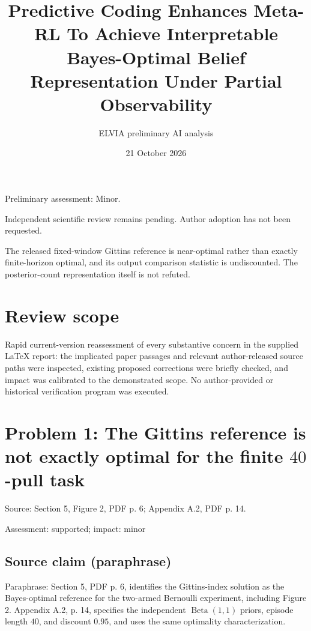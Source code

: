 \documentclass[11pt]{article}
\begin{document}
\title{Predictive Coding Enhances Meta-RL To Achieve Interpretable Bayes-Optimal Belief Representation Under Partial Observability}

\author{ELVIA preliminary AI analysis}\date{21 October 2026}\maketitle

Preliminary assessment: Minor.\par

Independent scientific review remains pending. Author adoption has not been requested.

The released fixed-window Gittins reference is near-optimal rather than exactly finite-horizon optimal, and its output comparison statistic is undiscounted. The posterior-count representation itself is not refuted.

\section*{Review scope}

Rapid current-version reassessment of every substantive concern in the supplied LaTeX report: the implicated paper passages and relevant author-released source paths were inspected, existing proposed corrections were briefly checked, and impact was calibrated to the demonstrated scope. No author-provided or historical verification program was executed.

\section*{Problem 1: The Gittins reference is not exactly optimal for the finite \(40\)-pull task}

Source: Section 5, Figure 2, PDF p. 6; Appendix A.2, PDF p. 14.

Assessment: supported; impact: minor

\subsection*{Source claim (paraphrase)}

Paraphrase: Section 5, PDF p. 6, identifies the Gittins-index solution as the Bayes-optimal reference for the two-armed Bernoulli experiment, including Figure 2. Appendix A.2, p. 14, specifies the independent \(\operatorname{Beta}(1,1)\) priors, episode length \(40\), and discount \(0.95\), and uses the same optimality characterization.
\end{document}
